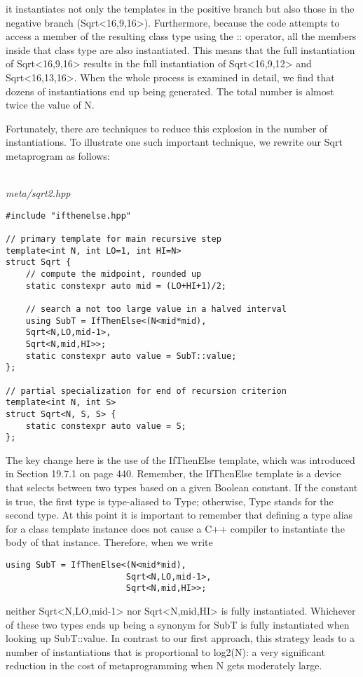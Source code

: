 it instantiates not only the templates in the positive branch but also those in the negative branch (Sqrt<16,9,16>). Furthermore, because the code attempts to access a member of the resulting class type using the :: operator, all the members inside that class type are also instantiated. This means that the full instantiation of Sqrt<16,9,16> results in the full instantiation of Sqrt<16,9,12> and Sqrt<16,13,16>. When the whole process is examined in detail, we find that dozens of instantiations end up being generated. The total number is almost twice the value of N.

Fortunately, there are techniques to reduce this explosion in the number of instantiations. To illustrate one such important technique, we rewrite our Sqrt metaprogram as follows:

\hspace*{\fill} \\ %
\noindent
\textit{meta/sqrt2.hpp}
\begin{lstlisting}[style=styleCXX]
#include "ifthenelse.hpp"

// primary template for main recursive step
template<int N, int LO=1, int HI=N>
struct Sqrt {
	// compute the midpoint, rounded up
	static constexpr auto mid = (LO+HI+1)/2;
	
	// search a not too large value in a halved interval
	using SubT = IfThenElse<(N<mid*mid),
	Sqrt<N,LO,mid-1>,
	Sqrt<N,mid,HI>>;
	static constexpr auto value = SubT::value;
};

// partial specialization for end of recursion criterion
template<int N, int S>
struct Sqrt<N, S, S> {
	static constexpr auto value = S;
};
\end{lstlisting}

The key change here is the use of the IfThenElse template, which was introduced in Section 19.7.1 on page 440. Remember, the IfThenElse template is a device that selects between two types based on a given Boolean constant. If the constant is true, the first type is type-aliased to Type; otherwise, Type stands for the second type. At this point it is important to remember that defining a type alias for a class template instance does not cause a C++ compiler to instantiate the body of that instance. Therefore, when we write

\begin{lstlisting}[style=styleCXX]
using SubT = IfThenElse<(N<mid*mid),
						Sqrt<N,LO,mid-1>,
						Sqrt<N,mid,HI>>;
\end{lstlisting}

neither Sqrt<N,LO,mid-1> nor Sqrt<N,mid,HI> is fully instantiated. Whichever of these two types ends up being a synonym for SubT is fully instantiated when looking up SubT::value. In contrast to our first approach, this strategy leads to a number of instantiations that is proportional to log2(N): a very significant reduction in the cost of metaprogramming when N gets moderately large.















